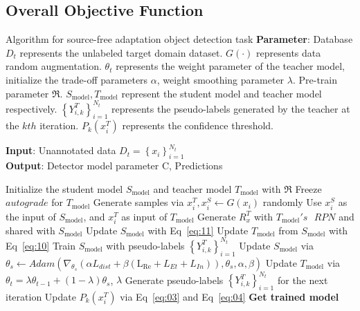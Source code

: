 \documentclass[sn-mathphys]{sn-jnl}%
\theoremstyle{thmstyleone}%
\theoremstyle{thmstyletwo}%
\theoremstyle{thmstylethree}%
\begin{document}
\subsection{Overall Objective Function}

\begin{algorithm}[tb]
	\caption{Algorithm for source-free adaptation object detection task
		\textbf{Parameter}: Database ${{D}_{t}}$ represents the unlabeled target domain dataset. $G(\cdot )$ represents data random augmentation. ${{\theta }_{t}}$ represents the weight parameter of the teacher model, initialize the trade-off parameters $\alpha $, weight smoothing parameter $\lambda $. Pre-train parameter $\Re$. ${{S}_{\text{model}}},{{T}_{\text{model}}}$ represent the student model and teacher model respectively. $\left\{ Y_{i,k}^{T} \right\}_{i=1}^{{{N}_{t}}}$ represents the pseudo-labels generated by the teacher at the $kth$ iteration. ${{P}_{k}}(x_{i}^{T})$ represents the confidence threshold.}
	\label{alg:algorithm}
	\textbf{Input}: Unannotated data ${{D}_{t}}=\left\{ {{x}_{i}} \right\}_{i=1}^{{{N}_{t}}}$ \\	
	\textbf{Output}: Detector model parameter C, Predictions 
	\begin{algorithmic}[1] %
		\State Initialize the student model ${{S}_{\text{model}}}$ and teacher model ${{T}_{\text{model}}}$ with $\Re$
		\State Freeze $autograde$ for ${{T}_{\text{model}}}$
		\State Generate samples via $x_{i}^{T},x_{i}^{S}\leftarrow G\left( {{x}_{i}} \right)$ randomly
		\State Use $x_{i}^{S}$ as the input of ${{S}_{\text{model}}}$, and $x_{i}^{T}$ as input of ${{T}_\text{model}}$
		\State Generate $R_{x}^{T}$ with ${{T}_{\text{model}}}'s\text{ }RPN$ and shared with ${{S}_\text{model}}$
		\State Update ${{S}_{\text{model}}}$ with Eq~\ref{eq:11}
		\State Update ${{T}_{\text{model}}}$ from ${{S}_{\text{model}}}$ with  Eq~\ref{eq:10}
		\State Train ${{S}_{\text{model}}}$ with pseudo-labels $\left\{ Y_{i,k}^{T} \right\}_{i=1}^{{{N}_{t}}}$
		\State Update ${{S}_{\text{model}}}$ via ${{\theta }_{s}}\leftarrow Adam\left( {{\nabla }_{{{\theta }_{s}}}}\left( \alpha {{L}_{dist}}+\beta \left( {{\text{L}}_{\operatorname{Re}}}+{{L}_{Et}}+{{L}_{In}} \right) \right),{{\theta }_{s}},\alpha ,\beta  \right)$
		\State  Update ${{T}_{\text{model}}}$ via ${{\theta }_{t}}=\lambda {{\theta }_{t-1}}+\left( 1-\lambda  \right){{\theta }_{s}}$, $\lambda $
		\EndIf 
		\EndFor
		\State Generate pseudo-labels $\left\{ Y_{i,k}^{T} \right\}_{i=1}^{{{N}_{t}}}$ for the next iteration
		\State Update ${{P}_{k}}(x_{i}^{T})$ via Eq~\ref{eq:03} and Eq~\ref{eq:04}
		\EndFor
		\State \textbf{Get trained model}
		
	\end{algorithmic}
\end{algorithm}
\end{document}
